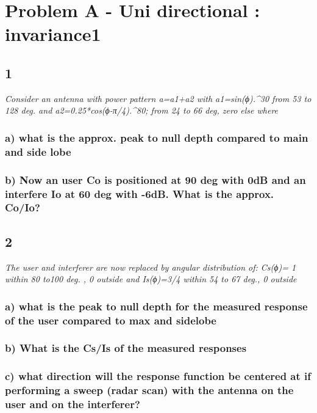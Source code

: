\section{Problem A - Uni directional : invariance1} \label{sec:mm4_PbA}

\subsection{1}
\textit{Consider an antenna with power pattern a=a1+a2 with a1=sin(ϕ).^30 from 53 to 128 deg. and a2=0.25*cos(ϕ-π/4).^80; from 24 to 66 deg, zero else where}

\subsubsection{a) what is the approx. peak to null depth compared to main and side lobe}


\subsubsection{b) Now an user Co is positioned at 90 deg with 0dB and an interfere Io at 60 deg with -6dB. What is the approx. Co/Io?}


\subsection{2}
\textit{The user and interferer are now replaced by angular distribution of: Cs(ϕ)= 1 within 80 to100 deg. , 0 outside and Is(ϕ)=3/4 within 54 to 67 deg., 0 outside}

\subsubsection{a) what is the peak to null depth for the measured response of the user compared to max and sidelobe}


\subsubsection{b) What is the Cs/Is of the measured responses}

\subsubsection{c) what direction will the response function be centered at if performing a sweep (radar scan) with the antenna on the user and on the interferer?}